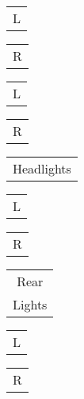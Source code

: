 \documentclass{book}
\begin{document}
\stopmpxshipout
\mpxshipout%
{\small \renewcommand{\arraystretch}{.9}
                \circuitfont\begin{tabular}[t]{@{}r@{}}
                   L
	        \end{tabular}}%
\stopmpxshipout
\mpxshipout%
{\small \renewcommand{\arraystretch}{.9}
                \circuitfont\begin{tabular}[t]{@{}r@{}}
                   R
	        \end{tabular}}%
\stopmpxshipout
\mpxshipout%
{\small \renewcommand{\arraystretch}{.9}
                \circuitfont\begin{tabular}[t]{@{}r@{}}
                   L
	        \end{tabular}}%
\stopmpxshipout
\mpxshipout%
{\small \renewcommand{\arraystretch}{.9}
                \circuitfont\begin{tabular}[t]{@{}r@{}}
                   R
	        \end{tabular}}%
\stopmpxshipout
\mpxshipout%
{\small \renewcommand{\arraystretch}{.9}
                \circuitfont\begin{tabular}[t]{@{}c@{}}
                   Headlights
	        \end{tabular}}%
\stopmpxshipout
\mpxshipout%
{\small \renewcommand{\arraystretch}{.9}
                \circuitfont\begin{tabular}[t]{@{}r@{}}
                   L
	        \end{tabular}}%
\stopmpxshipout
\mpxshipout%
{\small \renewcommand{\arraystretch}{.9}
                \circuitfont\begin{tabular}[t]{@{}r@{}}
                   R
	        \end{tabular}}%
\stopmpxshipout
\mpxshipout%
{\small \renewcommand{\arraystretch}{.9}
                \circuitfont\begin{tabular}[t]{@{}c@{}}
                   Rear \\ Lights
	        \end{tabular}}%
\stopmpxshipout
\mpxshipout%
{\small \renewcommand{\arraystretch}{.9}
                \circuitfont\begin{tabular}[t]{@{}r@{}}
                   L
	        \end{tabular}}%
\stopmpxshipout
\mpxshipout%
{\small \renewcommand{\arraystretch}{.9}
                \circuitfont\begin{tabular}[t]{@{}r@{}}
                   R
	        \end{tabular}}%
\end{document}
